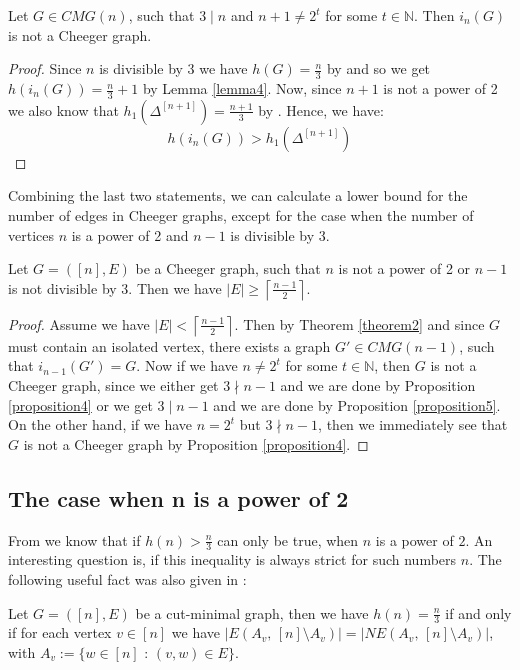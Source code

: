 \begin{prop}\label{proposition5}
Let \(G\in CMG(n)\), such that \(3\mid n\) and \(n+1\neq2^t\) for some \(t\in\mathbb{N}\). Then \(i_n(G)\) is not a Cheeger graph.
\begin{proof}
Since \(n\) is divisible by 3 we have \(h(G)=\frac{n}{3}\) by \cite{1} and so we get\\
\(h(i_n(G))=\frac{n}{3}+1\) by Lemma \ref{lemma4}. Now, since \(n+1\) is not a power of 2 we also know that \(h_1(\Delta^{[n+1]})=\frac{n+1}{3}\) by \cite{1}. Hence, we have:
\[
h(i_n(G))>h_1(\Delta^{[n+1]})
\]
\end{proof}
\end{prop}
Combining the last two statements, we can calculate a lower bound for the number of edges in Cheeger graphs, except for the case when the number of vertices \(n\) is a power of 2 and \(n-1\) is divisible by 3.
\begin{prop}
Let \(G=([n],E)\) be a Cheeger graph, such that \(n\) is not a power of 2 or \(n-1\) is not divisible by 3. Then we have \(|E|\geq\left\lceil\frac{n-1}{2}\right\rceil\).
\begin{proof}
Assume we have \(|E|<\left\lceil\frac{n-1}{2}\right\rceil\). Then by Theorem \ref{theorem2} and since \(G\) must contain an isolated vertex, there exists a graph \(G'\in CMG(n-1)\), such that \(i_{n-1}(G')=G\). Now if we have \(n\neq 2^t\) for some \(t\in\mathbb{N}\), then \(G\) is not a Cheeger graph, since we either get \(3\nmid n-1\) and we are done by Proposition \ref{proposition4} or we get \(3\mid n-1\) and we are done by Proposition \ref{proposition5}. On the other hand, if we have \(n=2^t\) but \(3\nmid n-1\), then we immediately see that \(G\) is not a Cheeger graph by Proposition \ref{proposition4}.
\end{proof}
\end{prop}

\subsection{The case when n is a power of 2}

From \cite{1} we know that if \(h(n)>\frac{n}{3}\) can only be true, when \(n\) is a power of \(2\). An interesting question is, if this inequality is always strict for such numbers \(n\). The following useful fact was also given in \cite{1}:

\begin{lem}\label{lemma11:2}
Let \(G=([n],E)\) be a cut-minimal graph, then we have \(h(n)=\frac{n}{3}\) if and only if for each vertex \(v\in [n]\) we have \(|E(A_v\text{, }[n]\setminus A_v)|=|NE(A_v\text{, }[n]\setminus A_v)|\), with \(A_v:=\{w\in [n]\text{ : }(v,w)\in E\}\).
\end{lem}

